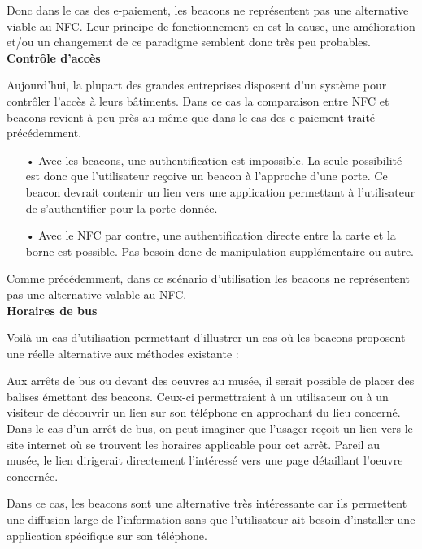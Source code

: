 \documentclass[12pt]{article}
\begin{document}
Donc dans le cas des e-paiement, les beacons ne représentent pas une alternative viable au NFC. Leur principe de fonctionnement en est la cause, une amélioration et/ou un changement de ce paradigme semblent donc très peu probables. \\

\textbf{Contrôle d'accès}
\medskip

Aujourd'hui, la plupart des grandes entreprises disposent d'un système pour contrôler l'accès à leurs bâtiments. Dans ce cas la comparaison entre NFC et beacons revient à peu près au même que dans le cas des e-paiement traité précédemment.

\begin{itemize}
\item[•] Avec les beacons, une authentification est impossible. La seule possibilité est donc que l'utilisateur reçoive un beacon à l'approche d'une porte. Ce beacon devrait contenir un lien vers une application permettant à l'utilisateur de s'authentifier pour la porte donnée.

\item[•] Avec le NFC par contre, une authentification directe entre la carte et la borne est possible. Pas besoin donc de manipulation supplémentaire ou autre.
\end{itemize}

Comme précédemment, dans ce scénario d'utilisation les beacons ne représentent pas une alternative valable au NFC. \\

\textbf{Horaires de bus}
\medskip

Voilà un cas d'utilisation permettant d'illustrer un cas où les beacons proposent une réelle alternative aux méthodes existante : 

Aux arrêts de bus ou devant des oeuvres au musée, il serait possible de placer des balises émettant des beacons. Ceux-ci permettraient à un utilisateur ou à un visiteur de découvrir un lien sur son téléphone en approchant du lieu concerné. Dans le cas d'un arrêt de bus, on peut imaginer que l'usager reçoit un lien vers le site internet où se trouvent les horaires applicable pour cet arrêt. Pareil au musée, le lien dirigerait directement l'intéressé vers une page détaillant l'oeuvre concernée.

Dans ce cas, les beacons sont une alternative très intéressante car ils permettent une diffusion large de l'information sans que l'utilisateur ait besoin d'installer une application spécifique sur son téléphone. \\\\
\end{document}
